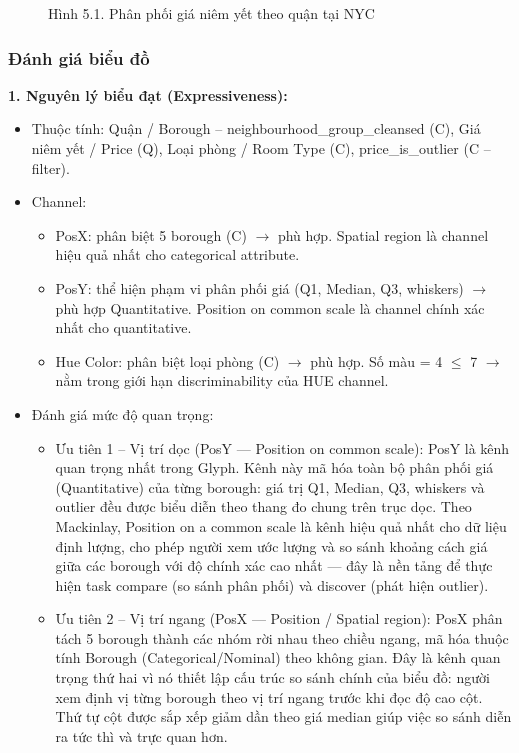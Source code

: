 \begin{figure}[H]
    \centering
    \caption{Hình 5.1. Phân phối giá niêm yết theo quận tại NYC}
    \label{fig:domain-task5-chart1}
\end{figure}

\subsubsection{Đánh giá biểu đồ}

\textbf{1. Nguyên lý biểu đạt (Expressiveness):}

\begin{itemize}
    \item Thuộc tính: Quận / Borough -- neighbourhood\_group\_cleansed (C), Giá niêm yết / Price (Q), Loại phòng / Room Type (C), price\_is\_outlier (C -- filter).
    \item Channel:
    \begin{itemize}
        \item PosX: phân biệt 5 borough (C) $\rightarrow$ phù hợp. Spatial region là channel hiệu quả nhất cho categorical attribute.
        \item PosY: thể hiện phạm vi phân phối giá (Q1, Median, Q3, whiskers) $\rightarrow$ phù hợp Quantitative. Position on common scale là channel chính xác nhất cho quantitative.
        \item Hue Color: phân biệt loại phòng (C) $\rightarrow$ phù hợp. Số màu = 4 $\leq$ 7 $\rightarrow$ nằm trong giới hạn discriminability của HUE channel.
    \end{itemize}
    \item Đánh giá mức độ quan trọng:
    \begin{itemize}
        \item Ưu tiên 1 -- Vị trí dọc (PosY --- Position on common scale): PosY là kênh quan trọng nhất trong Glyph. Kênh này mã hóa toàn bộ phân phối giá (Quantitative) của từng borough: giá trị Q1, Median, Q3, whiskers và outlier đều được biểu diễn theo thang đo chung trên trục dọc. Theo Mackinlay, Position on a common scale là kênh hiệu quả nhất cho dữ liệu định lượng, cho phép người xem ước lượng và so sánh khoảng cách giá giữa các borough với độ chính xác cao nhất --- đây là nền tảng để thực hiện task compare (so sánh phân phối) và discover (phát hiện outlier).
        \item Ưu tiên 2 -- Vị trí ngang (PosX --- Position / Spatial region): PosX phân tách 5 borough thành các nhóm rời nhau theo chiều ngang, mã hóa thuộc tính Borough (Categorical/Nominal) theo không gian. Đây là kênh quan trọng thứ hai vì nó thiết lập cấu trúc so sánh chính của biểu đồ: người xem định vị từng borough theo vị trí ngang trước khi đọc độ cao cột. Thứ tự cột được sắp xếp giảm dần theo giá median giúp việc so sánh diễn ra tức thì và trực quan hơn.

\end{itemize}
\end{itemize}
